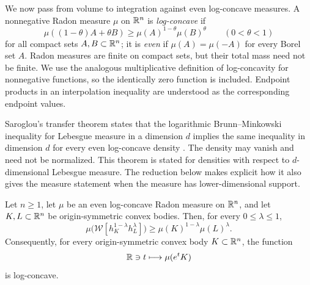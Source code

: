 We now pass from volume to integration against even log-concave measures.
A nonnegative Radon measure $\mu$ on $\mathbb R^n$ is \emph{log-concave} if
\[
 \mu((1-\theta)A+\theta B)
 \ge \mu(A)^{1-\theta}\mu(B)^\theta
 \qquad(0<\theta<1)
\]
for all compact sets $A,B\subset\mathbb R^n$; it is \emph{even} if
$\mu(A)=\mu(-A)$ for every Borel set $A$. Radon measures are finite on
compact sets, but their total mass need not be finite. We use the analogous
multiplicative definition of log-concavity for nonnegative functions, so
the identically zero function is included. Endpoint products in an
interpolation inequality are understood as the corresponding endpoint
values.

Saroglou's transfer theorem states that the logarithmic Brunn--Minkowski
inequality for Lebesgue measure in a dimension $d$ implies the same
inequality in dimension $d$ for every even log-concave density
\cite[Theorem~3.1]{Saroglou2016}. The density may vanish and need not be
normalized. This theorem is stated for densities with respect to
$d$-dimensional Lebesgue measure. The reduction below makes explicit how
it also gives the measure statement when the measure has lower-dimensional
support.

\begin{corollary}
\label{cor:measure}
Let $n\ge1$, let $\mu$ be an even log-concave Radon measure on $\mathbb R^n$, and
let $K,L\subset\mathbb R^n$ be origin-symmetric convex bodies. Then, for every
$0\le\lambda\le1$,
\begin{equation}\label{eq:measure-logbm}
 \mu\bigl(\mathcal W[h_K^{1-\lambda}h_L^\lambda]\bigr)
 \ge \mu(K)^{1-\lambda}\mu(L)^\lambda.
\end{equation}
Consequently, for every origin-symmetric convex body $K\subset\mathbb R^n$, the
function
\begin{equation}\label{eq:b-function}
 \mathbb R\ni t\longmapsto \mu(e^tK)
\end{equation}
is log-concave.
\end{corollary}

